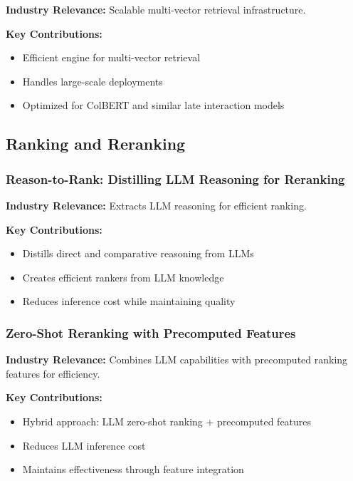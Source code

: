 \documentclass[11pt,letterpaper]{article}
\begin{document}
\textbf{Industry Relevance:} Scalable multi-vector retrieval infrastructure.

\textbf{Key Contributions:}
\begin{itemize}[leftmargin=*]
    \item Efficient engine for multi-vector retrieval
    \item Handles large-scale deployments
    \item Optimized for ColBERT and similar late interaction models
\end{itemize}

\subsection{Ranking and Reranking}

\subsubsection{Reason-to-Rank: Distilling LLM Reasoning for Reranking}

\textbf{Industry Relevance:} Extracts LLM reasoning for efficient ranking.

\textbf{Key Contributions:}
\begin{itemize}[leftmargin=*]
    \item Distills direct and comparative reasoning from LLMs
    \item Creates efficient rankers from LLM knowledge
    \item Reduces inference cost while maintaining quality
\end{itemize}

\subsubsection{Zero-Shot Reranking with Precomputed Features}

\textbf{Industry Relevance:} Combines LLM capabilities with precomputed ranking features for efficiency.

\textbf{Key Contributions:}
\begin{itemize}[leftmargin=*]
    \item Hybrid approach: LLM zero-shot ranking + precomputed features
    \item Reduces LLM inference cost
    \item Maintains effectiveness through feature integration
\end{itemize}
\end{document}
